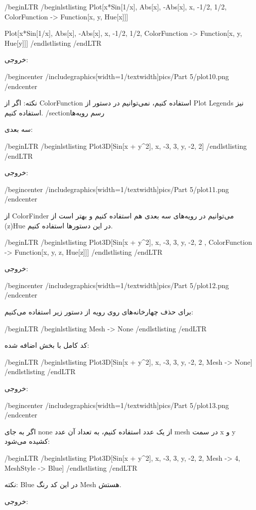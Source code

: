 /begin{LTR}
/begin{lstlisting}
Plot[{x*Sin[1/x], Abs[x], -Abs[x]}, {x, -1/2, 1/2}, 
 ColorFunction -> Function[{x, y}, Hue[x]]]

Plot[{x*Sin[1/x], Abs[x], -Abs[x]}, {x, -1/2, 1/2}, 
 ColorFunction -> Function[{x, y}, Hue[y]]]
/end{lstlisting}
/end{LTR}

خروجی:

/begin{center}
/includegraphics[width=1/textwidth]{pics/Part 5/plot10.png}
/end{center}

نکته: اگر از ColorFunction استفاده کنیم، نمی‌توانیم در دستور از Plot Legends نیز استفاده کنیم.
/section{رسم رویه‌ها}

سه بعدی:

/begin{LTR}
/begin{lstlisting}
Plot3D[Sin[x + y^2], {x, -3, 3}, {y, -2, 2}]
/end{lstlisting}
/end{LTR}

خروجی:

/begin{center}
/includegraphics[width=1/textwidth]{pics/Part 5/plot11.png}
/end{center}

از ColorFinder می‌توانیم در رویه‌های سه بعدی هم استفاده کنیم و بهتر است از (z)Hue در این دستور‌ها استفاده کنیم.

/begin{LTR}
/begin{lstlisting}
Plot3D[Sin[x + y^2], {x, -3, 3}, {y, -2, 2} , 
 ColorFunction -> Function[{x, y, z}, Hue[z]]]
/end{lstlisting}
/end{LTR}

خروجی:

/begin{center}
/includegraphics[width=1/textwidth]{pics/Part 5/plot12.png}
/end{center}

برای حذف چهارخانه‌های روی رویه از دستور زیر استفاده می‌کنیم:

/begin{LTR}
/begin{lstlisting}
Mesh -> None
/end{lstlisting}
/end{LTR}

کد کامل با بخش اضافه شده:

/begin{LTR}
/begin{lstlisting}
Plot3D[Sin[x + y^2], {x, -3, 3}, {y, -2, 2}, Mesh -> None]
/end{lstlisting}
/end{LTR}

خروجی:

/begin{center}
/includegraphics[width=1/textwidth]{pics/Part 5/plot13.png}
/end{center}

اگر به جای none از یک عدد استفاده کنیم، به تعداد آن عدد mesh در سمت x و y کشیده می‌شود:

/begin{LTR}
/begin{lstlisting}
Plot3D[Sin[x + y^2], {x, -3, 3}, {y, -2, 2}, Mesh -> 4, 
 MeshStyle -> Blue]
/end{lstlisting}
/end{LTR}

نکته: Blue در این کد رنگ Mesh هستش.

خروجی:

